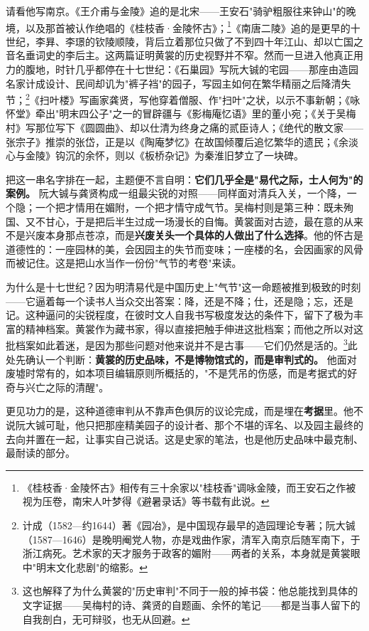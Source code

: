 \documentclass[UTF8,fontset=none,zihao=-4,a4paper]{ctexart}
\newcommand{\fb}{\CJKfamily{zhfb}}
\begin{document}
请看他写南京。《王介甫与金陵》追的是北宋——王安石"骑驴粗服往来钟山"的晚境，以及那首被认作绝唱的《桂枝香·金陵怀古》；\footnote{《桂枝香·金陵怀古》相传有三十余家以"桂枝香"调咏金陵，而王安石之作被视为压卷，南宋人叶梦得《避暑录话》等书载有此说。}《南唐二陵》追的是更早的十世纪，李{\fb 昪}、李{\fb 璟}的钦陵顺陵，背后立着那位只做了不到四十年江山、却以亡国之音名垂词史的李后主。这两篇证明黄裳的历史视野并不窄。然而一旦进入他真正用力的腹地，时针几乎都停在十七世纪：《石巢园》写阮大铖的宅园——那座由造园名家计成设计、民间却讥为"裤子裆"的园子，写园主如何在繁华精丽之后降清失节；\footnote{计成（1582—约1644）著《园冶》，是中国现存最早的造园理论专著；阮大铖（1587—1646）是晚明阉党人物，亦是戏曲作家，清军入南京后随军南下，于浙江病死。艺术家的天才服务于政客的媚附——两者的关系，本身就是黄裳眼中"明末文化悲剧"的缩影。}《扫叶楼》写画家龚贤，写他穿着僧服、作"扫叶"之状，以示不事新朝；《咏怀堂》牵出"明末四公子"之一的冒辟疆与《影梅庵忆语》里的董小宛；《关于吴梅村》写那位写下《圆圆曲》、却以仕清为终身之痛的贰臣诗人；《绝代的散文家——张宗子》推崇的张岱，正是以《陶庵梦忆》在故国倾覆后追忆繁华的遗民；《余淡心与金陵》钩沉的余怀，则以《板桥杂记》为秦淮旧梦立了一块碑。


把这一串名字排在一起，主题便不言自明：\textbf{它们几乎全是"易代之际，士人何为"的案例。} 阮大铖与龚贤构成一组最尖锐的对照——同样面对清兵入关，一个降，一个隐；一个把才情用在媚附，一个把才情守成气节。吴梅村则是第三种：既未殉国、又不甘心，于是把后半生过成一场漫长的自悔。黄裳面对古迹，最在意的从来不是兴废本身那点苍凉，而是\textbf{兴废关头一个具体的人做出了什么选择}。他的怀古是道德性的：一座园林的美，会因园主的失节而变味；一座楼的名，会因画家的风骨而被记住。这是把山水当作一份份"气节的考卷"来读。


为什么是十七世纪？因为明清易代是中国历史上"气节"这一命题被推到极致的时刻——它逼着每一个读书人当众交出答案：降，还是不降；仕，还是隐；忘，还是记。这种逼问的尖锐程度，在彼时文人自我书写极度发达的条件下，留下了极为丰富的精神档案。黄裳作为藏书家，得以直接把触手伸进这批档案；而他之所以对这批档案如此着迷，是因为那些问题对他来说并不是古事——它们仍然是活的。\footnote{这也解释了为什么黄裳的"历史审判"不同于一般的掉书袋：他总能找到具体的文字证据——吴梅村的诗、龚贤的自题画、余怀的笔记——都是当事人留下的自我剖白，无可辩驳，也无从回避。}此处先确认一个判断：\textbf{黄裳的历史品味，不是博物馆式的，而是审判式的。} 他面对废墟时常有的，如本项目编辑原则所概括的，"不是凭吊的伤感，而是考据式的好奇与兴亡之际的清醒"。


更见功力的是，这种道德审判从不靠声色俱厉的议论完成，而是埋在\textbf{考据}里。他不说阮大铖可耻，他只把那座精美园子的设计者、那个不堪的诨名、以及园主最终的去向并置在一起，让事实自己说话。这是史家的笔法，也是他历史品味中最克制、最耐读的部分。
\end{document}
